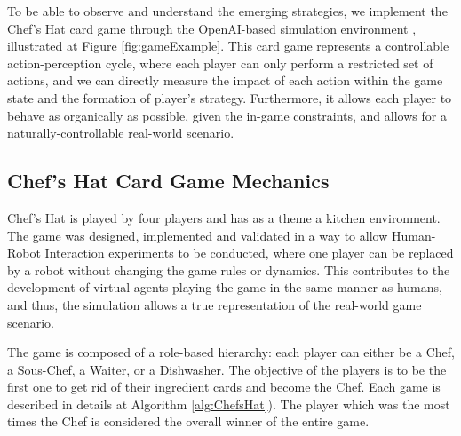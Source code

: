 \documentclass[a4paper,conference]{IEEEtran}
\begin{document}
To be able to observe and understand the emerging strategies, we implement the Chef's Hat card game \cite{barros2020food} through the OpenAI-based simulation environment \cite{barros2020chef}, illustrated at Figure \ref{fig:gameExample}. This card game represents a controllable action-perception cycle, where each player can only perform a restricted set of actions, and we can directly measure the impact of each action within the game state and the formation of player's strategy. Furthermore, it allows each player to behave as organically as possible, given the in-game constraints, and allows for a naturally-controllable real-world scenario. 



\subsection{Chef's Hat Card Game Mechanics}

Chef's Hat is played by four players and has as a theme a kitchen environment. The game was designed, implemented and validated in a way to allow Human-Robot Interaction experiments to be conducted, where one player can be replaced by a robot without changing the game rules or dynamics. This contributes to the development of virtual agents playing the game in the same manner as humans, and thus, the simulation allows a true representation of the real-world game scenario.

The game is composed of a role-based hierarchy: each player can either be a Chef, a Sous-Chef, a Waiter, or a Dishwasher. The objective of the players is to be the first one to get rid of their ingredient cards and become the Chef. Each game is described in details at Algorithm \ref{alg:ChefsHat}). The player which was the most times the Chef is considered the overall winner of the entire game.
\end{document}
